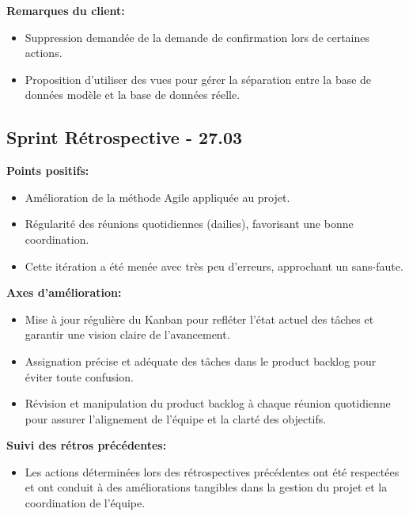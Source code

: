 \documentclass[11pt]{article}
\begin{document}
\textbf{Remarques du client:}
\begin{itemize}
  \item Suppression demandée de la demande de confirmation lors de certaines actions.
  \item Proposition d'utiliser des vues pour gérer la séparation entre la base de données modèle et la base de données réelle.
\end{itemize}











\subsection*{{\color{navy}Sprint Rétrospective - 27.03}}

\textbf{Points positifs:}
\begin{itemize}
  \item Amélioration de la méthode Agile appliquée au projet.
  \item Régularité des réunions quotidiennes (dailies), favorisant une bonne coordination.
  \item Cette itération a été menée avec très peu d'erreurs, approchant un sans-faute.
\end{itemize}

\textbf{Axes d'amélioration:}
\begin{itemize}
  \item Mise à jour régulière du Kanban pour refléter l'état actuel des tâches et garantir une vision claire de l'avancement.
  \item Assignation précise et adéquate des tâches dans le product backlog pour éviter toute confusion.
  \item Révision et manipulation du product backlog à chaque réunion quotidienne pour assurer l'alignement de l'équipe et la clarté des objectifs.
\end{itemize}

\textbf{Suivi des rétros précédentes:}
\begin{itemize}
  \item Les actions déterminées lors des rétrospectives précédentes ont été respectées et ont conduit à des améliorations tangibles dans la gestion du projet et la coordination de l'équipe.
\end{itemize}
\end{document}
